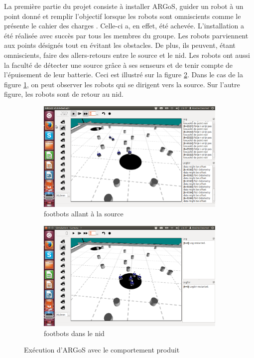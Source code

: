 \documentclass[a4paper,12pt]{report}
\begin{document}
La première partie du projet consiste à installer ARGoS, guider un robot à un point donné et remplir l'objectif lorsque les robots sont omniscients comme le présente le cahier des charges \cite{cahierCharges}. Celle-ci a, en effet, été achevée. L'installation a été réalisée avec succès par tous les membres du groupe. Les robots parviennent aux points désignés tout en évitant les obstacles. De plus, ils peuvent, étant omniscients, faire des allers-retours entre le source et le nid. Les robots ont aussi la faculté de détecter une source grâce à ses senseurs et de tenir compte de l'épuisement de leur batterie. Ceci est illustré sur la figure \ref{fig:ourArgos}. Dans le cas de la figure \ref{fig:argosNest}, on  peut observer les robots qui se dirigent vers la source. Sur l'autre figure, les robots sont  de retour au nid.

\begin{figure}[h!]
        \centering
        \begin{subfigure}[h!]{0.4\textwidth}
                \includegraphics[trim = 60mm 40mm 75mm 45mm, clip, width=\textwidth]{ourArgos1.png}
                \caption{footbots allant à la source}
        \end{subfigure}   \begin{subfigure}[h!]{0.4\textwidth}
                \includegraphics[trim = 60mm 40mm 75mm 45mm, clip, width=\textwidth]{ourArgos2.png}
                \caption{footbots dans le nid\label{fig:argosNest}}
        \end{subfigure}
        \caption{Exécution d'ARGoS avec le comportement produit\label{fig:ourArgos}}
\end{figure}
\end{document}
